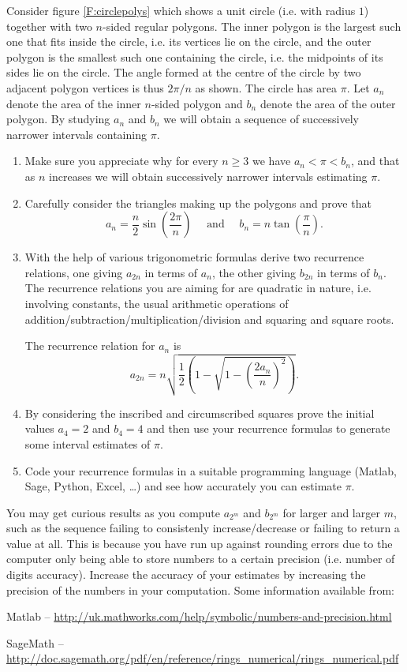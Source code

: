 \documentclass[oneside,10pt]{amsart}
\begin{document}
\begin{enumerate}
\noindent
Consider figure \ref{F:circlepolys} which shows a unit circle (i.e. with radius $1$) together with two $n$-sided regular polygons. The inner polygon is the largest such one that fits inside the circle, i.e. its vertices lie on the circle, and the outer polygon is the smallest such one containing the circle, i.e. the midpoints of its sides lie on the circle. The angle formed at the centre of the circle by two adjacent polygon vertices is thus $2\pi/n$ as shown. The circle has area $\pi$. Let $a_n$ denote the area of the inner $n$-sided polygon and $b_n$ denote the area of the outer polygon. By studying $a_n$ and $b_n$ we will obtain a sequence of successively narrower intervals containing $\pi$.
\begin{enumerate}
\item
Make sure you appreciate why for every $n \geq 3$ we have $a_n < \pi < b_n$, and that as $n$ increases we will obtain successively narrower intervals estimating $\pi$.
\item
Carefully consider the triangles making up the polygons and prove that
$$a_n = \frac{n}{2} \sin{\left ( \frac{2\pi}{n}\right )} \quad \text{ and } \quad
b_n = n \tan{\left (\frac{\pi}{n}\right )}.$$
\item
With the help of various trigonometric formulas derive two recurrence relations, one giving $a_{2n}$ in terms of $a_n$, the other giving $b_{2n}$ in terms of $b_n$. The recurrence relations you are aiming for are quadratic in nature, i.e. involving constants, the usual arithmetic operations of addition/subtraction/multiplication/division and squaring and square roots.
\begin{solution}{The recurrence relation for $a_n$ is
$$ a_{2n} = n \sqrt{\frac{1}{2} \left (1 - \sqrt{1 - \left ( \frac{2a_n}{n} \right )^2} \right )}.$$
}\end{solution}
\item
By considering the inscribed and circumscribed squares prove the initial values $a_4 = 2$ and $b_4 = 4$ and then use your recurrence formulas to generate some interval estimates of $\pi$.
\item
Code your recurrence formulas in a suitable programming language (Matlab, Sage, Python, Excel, \dots) and see how accurately you can estimate $\pi$. \comp
\end{enumerate}
\end{enumerate}
You may get curious results as you compute $a_{2^m}$ and $b_{2^m}$ for larger and larger $m$, such as the sequence failing to consistenly increase/decrease or failing to return a value at all. This is because you have run up against rounding errors due to the computer only being able to store numbers to a certain precision (i.e. number of digits accuracy). Increase the accuracy of your estimates by increasing the precision of the numbers in your computation. Some information available from:

Matlab -- \url{http://uk.mathworks.com/help/symbolic/numbers-and-precision.html}

SageMath --  \url{http://doc.sagemath.org/pdf/en/reference/rings_numerical/rings_numerical.pdf}
\end{document}
